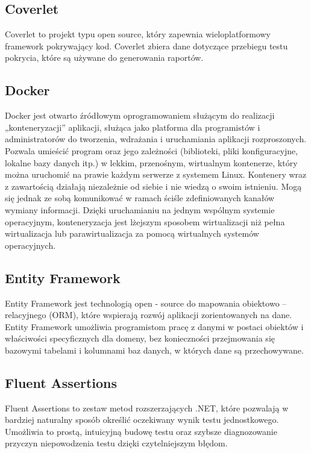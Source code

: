 \documentclass[12pt,a4paper]{article}
\begin{document}
		\subsection{Coverlet}
			\indent Coverlet to projekt typu open source, który zapewnia wieloplatformowy framework
			pokrywający kod. Coverlet zbiera dane dotyczące przebiegu testu pokrycia,
			które są używane do generowania raportów.

		\subsection{Docker}
			\indent Docker jest otwarto źródłowym oprogramowaniem służącym do realizacji „konteneryzacji” aplikacji, służąca jako platforma dla programistów
				i administratorów do tworzenia, wdrażania i uruchamiania aplikacji rozproszonych. Pozwala umieścić program oraz jego zależności (biblioteki,
				pliki konfiguracyjne, lokalne bazy danych itp.) w lekkim, przenośnym, wirtualnym kontenerze, który można uruchomić na prawie każdym serwerze
				z systemem Linux. Kontenery wraz z zawartością działają niezależnie od siebie i nie wiedzą o swoim istnieniu. Mogą się jednak ze sobą
				komunikować w ramach ściśle zdefiniowanych kanałów wymiany informacji. Dzięki uruchamianiu na jednym wspólnym systemie operacyjnym,
				konteneryzacja jest lżejszym sposobem wirtualizacji niż pełna wirtualizacja lub parawirtualizacja za pomocą wirtualnych systemów
				operacyjnych.
				 	
		\subsection{Entity Framework}		 
		 	\indent Entity Framework jest technologią open - source do mapowania obiektowo – relacyjnego (ORM), które wspierają rozwój aplikacji zorientowanych na dane.
		 	Entity Framework umożliwia programistom pracę z danymi w postaci obiektów i właściwości specyficznych dla domeny, bez konieczności przejmowania się bazowymi
		 	tabelami i kolumnami baz danych, w których dane są przechowywane. 

		\subsection{Fluent Assertions}
			\indent Fluent Assertions to zestaw metod rozszerzających .NET, które pozwalają
			w bardziej naturalny sposób określić oczekiwany wynik testu jednostkowego.
			Umożliwia to prostą, intuicyjną budowę testu oraz szybsze diagnozowanie przyczyn
			niepowodzenia testu dzięki czytelniejszym błędom.
\end{document}
